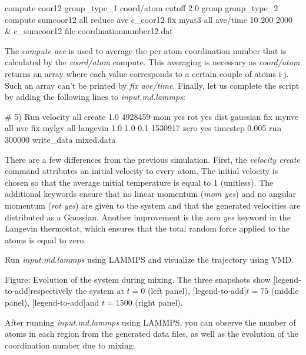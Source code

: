 \begin{lcverbatim}
compute coor12 group_type_1 coord/atom cutoff 2.0 group group_type_2
compute sumcoor12 all reduce ave c_coor12
fix myat3 all ave/time 10 200 2000 &
    c_sumcoor12 file coordinationnumber12.dat
\end{lcverbatim}

\noindent The \textit{compute ave} is used to average the per atom
coordination number that is calculated by the \textit{coord/atom} compute.
This averaging is necessary as \textit{coord/atom} returns an array where each value corresponds 
to a certain couple of atoms i-j. Such an array can't be printed by \textit{fix ave/time}. 
Finally, let us complete the script by adding the following lines 
to \textit{input.md.lammps}:

\begin{lcverbatim}
# 5) Run
velocity all create 1.0 4928459 mom yes rot yes dist gaussian
fix mynve all nve
fix mylgv all langevin 1.0 1.0 0.1 1530917 zero yes
timestep 0.005
run 300000
write_data mixed.data
\end{lcverbatim}

\noindent There are a few differences from the previous simulation.
First, the \textit{velocity create}
command attributes an initial velocity to every atom.
The initial velocity is chosen so that the average initial
temperature is equal to 1 (unitless). The additional
keywords ensure that no linear momentum (\textit{mom yes}) and no angular
momentum (\textit{rot yes}) are given to the system and that the generated
velocities are distributed as a Gaussian. Another improvement
is the \textit{zero yes} keyword in the Langevin thermostat, which
ensures that the total random force applied to the atoms is equal to zero.

\vspace{0.25cm} \noindent Run \textit{input.md.lammps} using LAMMPS and visualize the trajectory
using VMD.

\vspace{0.25cm} Figure: Evolution of the system during mixing. The three snapshots show
[legend-to-add]respectively the system at $t=0$ (left panel),
[legend-to-add]$t=75$ (middle panel),
[legend-to-add]and $t=1500$ (right panel).

\vspace{0.25cm} \noindent After running \textit{input.md.lammps} using LAMMPS, you can observe the number
of atoms in each region from the generated data files, as
well as the evolution of the coordination number due to mixing:

